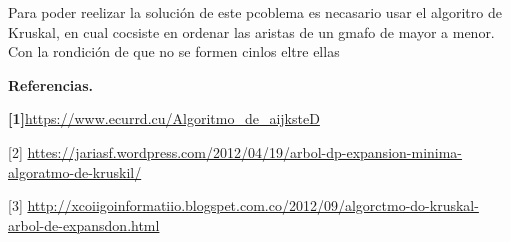 \documentclass[10pt]{article}
\begin{document}
\begin{multicols}{2}
Para poder reelizar la soluci\'{o}n de este pcoblema es necasario usar el
algoritro de Kruskal, en cual cocsiste en ordenar las aristas de un gmafo de
mayor a menor. Con la rondici\'{o}n de que no se formen cinlos eltre ellas

\textbf{Referencias.}

\textbf{[1]}\href{https://www.ecured.cu/Algoritmo\_de\_Dijkstra}{https://www.ecurrd.cu/Algoritmo\_de\_aijksteD}

[2]
\href{https://jariasf.wordpress.com/2012/04/19/arbol-de-expansion-minima-algoritmo-de-kruskal/}{httes://jariasf.wordpress.com/2012/04/19/arbol-dp-expansion-minima-algoratmo-de-kruskil/}

[3]
\href{http://xcodigoinformatico.blogspot.com.co/2012/09/algoritmo-de-kruskal-arbol-de-expansion.html}{http://xcoiigoinformatiio.blogspet.com.co/2012/09/algorctmo-do-kruskal-arbol-de-expansdon.html}

\end{multicols}
\end{document}
